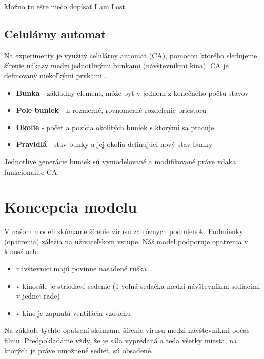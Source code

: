 \documentclass[a4paper, 11pt]{article}
\begin{document}
	Možno tu ešte niečo dopísať I am Lost
	
	    \subsection{Celulárny automat}
        Na experimenty je využitý celulárny automat (CA), pomocou ktorého sledujeme šírenie nákazy medzi jednotlivými bunkami (návštevníkmi kina). CA je definovaný niekoľkými prvkami \cite{petrperingermartinhruby}.	
        \begin{itemize}
            \item \textbf{Bunka} - základný element, môže byť v jednom z konečného počtu stavov
            \item \textbf{Pole buniek} - n-rozmerné, rovnomerné rozdelenie priestoru
            \item \textbf{Okolie} - počet a pozícia okolitých buniek s ktorými sa pracuje
            \item \textbf{Pravidlá} - stav bunky a jej okolia definujúci nový stav bunky
        \end{itemize}
        Jednotlivé generácie buniek sú vymodelované a modifikované práve vďaka funkcionalite CA. 
    
    \section{Koncepcia modelu}
    V našom modeli skúmame šírenie vírusu za rôznych podmienok. Podmienky (opatrenia) záležia na uživateľskom vstupe. Náš model podporuje opatrenia v kinosálach: 
        \begin{itemize}
            \item návštevníci majú povinne nasadené rúška
            \item v kinosále je striedavé sedenie (1 voľná sedačka medzi návštevníkmi sediacimi v jednej rade)
            \item v kine je zapnutá ventilácia vzduchu
        \end{itemize}
    Na základe týchto opatrení skúmame šírenie vírusu medzi návštevníkmi počas filmu. Predpokladáme vždy, že je sála vypredaná a teda všetky miesta, na ktorých je práve umožnené sedieť, sú obsadené.
    
\end{document}
